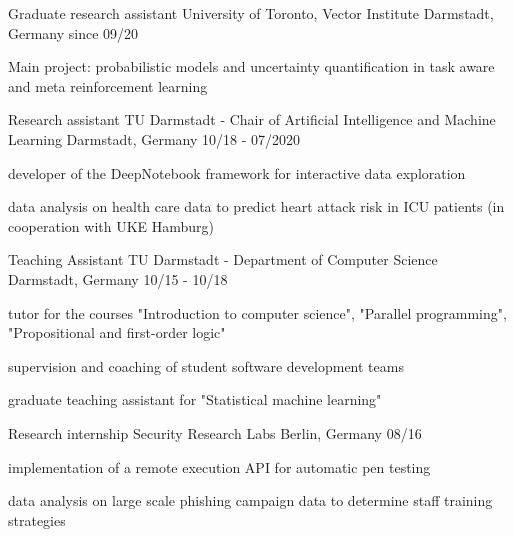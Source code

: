 

\begin{cventries}

  \cventry
    {Graduate research assistant}
    {University of Toronto, Vector Institute}
    {Darmstadt, Germany}
    {since 09/20}
    {
        \begin{cvitems}
        \item {Main project: probabilistic models and uncertainty quantification in task aware and meta reinforcement learning}
        \end{cvitems}
    }

  \cventry
    {Research assistant}
    {TU Darmstadt - Chair of Artificial Intelligence and Machine Learning}
    {Darmstadt, Germany}
    {10/18 - 07/2020}
    {
        \begin{cvitems}
        \item {developer of the DeepNotebook framework for interactive data exploration}
        \item {data analysis on health care data to predict heart attack risk in ICU patients (in cooperation with UKE Hamburg)}
        \end{cvitems}
    }

  \cventry
    {Teaching Assistant} %
    {TU Darmstadt - Department of Computer Science} %
    {Darmstadt, Germany} %
    {10/15 - 10/18} %
    {
      \begin{cvitems} %
        \item {tutor for the courses "Introduction to computer science", "Parallel programming", "Propositional and first-order logic"}
        \item {supervision and coaching of student software development teams}
        \item {graduate teaching assistant for "Statistical machine learning"}
      \end{cvitems}
    }

  \cventry
    {Research internship} %
    {Security Research Labs} %
    {Berlin, Germany} %
    {08/16} %
    {
      \begin{cvitems} %
        \item {implementation of a remote execution API for automatic pen testing}
        \item {data analysis on large scale phishing campaign data to determine staff training strategies}
      \end{cvitems}
    }


\end{cventries}
